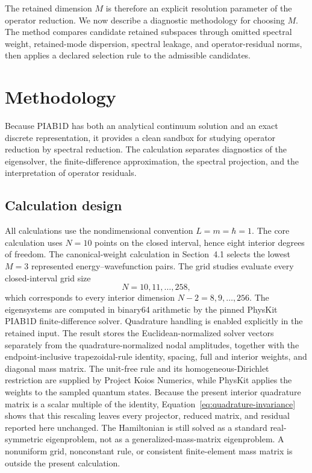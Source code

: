 \documentclass[11pt]{article}
\begin{document}
The retained dimension $M$ is therefore an explicit resolution parameter of the
operator reduction. We now describe a diagnostic methodology for choosing $M$. The
method compares candidate retained subspaces through omitted spectral weight,
retained-mode dispersion, spectral leakage, and operator-residual norms, then applies
a declared selection rule to the admissible candidates.

\section{Methodology}

Because PIAB1D has both an analytical continuum solution and an exact discrete
representation, it provides a clean sandbox for studying operator reduction by
spectral reduction. The calculation separates diagnostics of the eigensolver, the
finite-difference approximation, the spectral projection, and the interpretation of
operator residuals.

\subsection{Calculation design}

All calculations use the nondimensional convention $L=m=\hbar=1$. The core
calculation uses $N=10$ points on the closed interval, hence eight interior degrees of
freedom. The canonical-weight calculation in Section~4.1 selects the lowest $M=3$
represented energy--wavefunction pairs. The grid studies evaluate every closed-interval grid size
\begin{equation}
 N=10,11,\ldots,258,
 \label{eq:grid-series}
\end{equation}
which corresponds to every interior dimension $N-2=8,9,\ldots,256$. The
eigensystems are computed in binary64 arithmetic by the pinned PhysKit PIAB1D
finite-difference solver. Quadrature handling is enabled explicitly in the retained
input. The result stores the Euclidean-normalized solver vectors separately from the
quadrature-normalized nodal amplitudes, together with the endpoint-inclusive
trapezoidal-rule identity, spacing, full and interior weights, and diagonal mass
matrix. The unit-free rule and its homogeneous-Dirichlet restriction are supplied by
Project Koios Numerics, while PhysKit applies the weights to the sampled quantum
states. Because the present interior quadrature matrix is a scalar multiple of the
identity, Equation~\eqref{eq:quadrature-invariance} shows that this rescaling leaves
every projector, reduced matrix, and residual reported here unchanged. The
Hamiltonian is still solved as a standard real-symmetric eigenproblem, not as a
generalized-mass-matrix eigenproblem. A nonuniform grid, nonconstant rule, or
consistent finite-element mass matrix is outside the present calculation.
\end{document}
